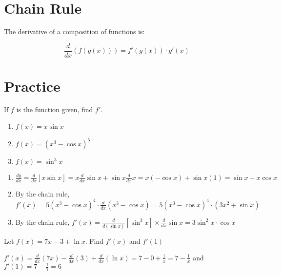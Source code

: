 \section{Chain Rule}

The derivative of a composition of functions is:

\begin{equation}
\frac{d}{dx}(f(g(x))) = f'(g(x)) \cdot g'(x)
\end{equation}

\section{Practice}
\begin{Exercise}[label=deriv_rules1]
If $f$ is the function given, find $f'$. 
	\begin{enumerate}
		\item$f(x) = x\sin{x}$
		\item$f(x)=(x^3-\cos{x})^5$
		\item$f(x) =\sin^3{x}$
	\end{enumerate}
\end{Exercise}

\begin{Answer}[ref=deriv_rules1]
	\begin{enumerate}
		\item $\frac{dy}{dx} = \frac{d}{dx}[x\sin{x}] = x\frac{d}{dx}\sin{x} 
		+ \sin{x}\frac{d}{dx}x = x(-\cos{x}) + \sin{x}(1) = \sin{x} - 
		x\cos{x}$
    	\item By the chain rule, $f'(x) = 5(x^3 - \cos{x})^4 \cdot 
    	\frac{d}{dx}(x^3 - \cos{x}) = 5(x^3 - \cos{x})^4 \cdot (3x^2 + 
    	\sin{x})$
    	\item By the chain rule, $f'(x) = \frac{d}{d(\sin{x})}[\sin^3{x}] 
    	\times \frac{d}{dx}\sin{x} = 3\sin^2{x} \cdot \cos{x}$
	\end{enumerate}
    
\end{Answer}

\begin{Exercise}[label=deriv_rules2]
    Let $f(x)=7x-3+\ln{x}$. Find $f'(x)$ and $f'(1)$
\end{Exercise}
\begin{Answer}[ref=deriv_rules2]
    $f'(x) = \frac{d}{dx}(7x) - \frac{d}{dx}(3) + \frac{d}{dx}(\ln{x})
    = 7 - 0 + \frac{1}{x} = 7 - \frac{1}{x}$
    and
    $f'(1) = 7-\frac{1}{1} = 6$
\end{Answer}
	
